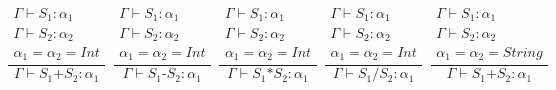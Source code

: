 \documentclass[10pt]{article} %
\begin{document}
\begin{enumerate}
$$\frac{\begin{matrix}\Gamma \vdash S_1: \alpha_1\\ \Gamma \vdash S_2: \alpha_2 \\ \alpha_1 = \alpha_2 = Int\end{matrix}}{\Gamma \vdash S_1 \texttt{+} S_2 : \alpha_1} \:\: 
\frac{\begin{matrix}\Gamma \vdash S_1: \alpha_1\\ \Gamma \vdash S_2: \alpha_2 \\ \alpha_1 = \alpha_2 = Int\end{matrix}}{\Gamma \vdash S_1 \texttt{-} S_2 : \alpha_1}\:\:
\frac{\begin{matrix}\Gamma \vdash S_1: \alpha_1\\ \Gamma \vdash S_2: \alpha_2 \\ \alpha_1 = \alpha_2 = Int\end{matrix}}{\Gamma \vdash S_1 \texttt{*} S_2 : \alpha_1}\:\:
\frac{\begin{matrix}\Gamma \vdash S_1: \alpha_1\\ \Gamma \vdash S_2: \alpha_2 \\ \alpha_1 = \alpha_2 = Int\end{matrix}}{\Gamma \vdash S_1 \texttt{/} S_2 : \alpha_1}\:\:
\frac{\begin{matrix}\Gamma \vdash S_1: \alpha_1\\ \Gamma \vdash S_2: \alpha_2 \\ \alpha_1 = \alpha_2 = String\end{matrix}}{\Gamma \vdash S_1 \texttt{+} S_2 : \alpha_1}$$


\end{enumerate}
\end{document}

